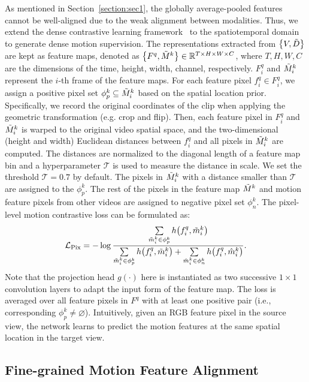 \documentclass[sigconf,screen]{acmart}
\begin{document}
As mentioned in Section~\ref{section:sec1}, the globally average-pooled features cannot be well-aligned due to the weak alignment between modalities. Thus, we extend the dense contrastive learning framework~\cite{PixPro} to the spatiotemporal domain to generate dense motion supervision. The representations extracted from $\big\{V, \Tilde{D}\big\}$ are kept as feature maps, denoted as $\big\{F^q, \Tilde{M}^k\big\} \in \mathbb{R}^{T \times H \times W \times C}$, where $T,H,W,C$ are the dimensions of the time, height, width, channel, respectively. $F_i^q$ and $\Tilde{M}_i^k$ represent the $i$-th frame of the feature maps. For each feature pixel $f_i^q \in F_i^q$, we assign a positive pixel set $\phi_p^k \subseteq \Tilde{M}_i^k$ based on the spatial location prior. Specifically, we record the original coordinates of the clip when applying the geometric transformation (e.g. crop and flip). Then, each feature pixel in $F_i^q$ and $\Tilde{M}_i^k$ is warped to the original video spatial space, and the two-dimensional (height and width) Euclidean distances between $f_i^q$ and all pixels in $\Tilde{M}_i^k$ are computed. The distances are normalized to the diagonal length of a feature map bin and a hyperparameter $\mathcal{T}$ is used to measure the distance in scale. We set the threshold $\mathcal{T}=0.7$ by default. The pixels in $\Tilde{M}_i^k$ with a distance smaller than $\mathcal{T}$ are assigned to the $\phi_p^k$. The rest of the pixels in the feature map $\Tilde{M}^k$ and motion feature pixels from other videos are assigned to negative pixel set $\phi_n^k$. The pixel-level motion contrastive loss can be formulated as:
\begin{equation} \label{eq3}
\mathcal{L}_{\mathrm{Pix}}=-\log \frac{\sum\limits_{\Tilde{m}_i^k \in \phi_p^k} h\big(f_i^q, \Tilde{m}_i^k\big)}{\sum\limits_{\Tilde{m}_i^k \in \phi_p^k} h\big(f_i^q, \Tilde{m}_i^k\big)+\sum\limits_{\hat{m}_i^k \in \phi_n^k} h\big(f_i^q, \hat{m}_i^k\big)}.
\end{equation}
Note that the projection head $g(\cdot)$ here is instantiated as two successive $1 \times 1$ convolution layers to adapt the input form of the feature map. The loss is averaged over all feature pixels in $F^q$ with at least one positive pair (i.e., corresponding $\phi_p^k \ne \varnothing$). Intuitively, given an RGB feature pixel in the source view, the network learns to predict the motion features at the same spatial location in the target view.

\subsection{Fine-grained Motion Feature Alignment}\label{section:sec3.2}
\end{document}
